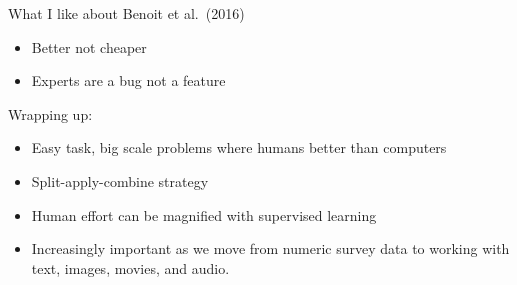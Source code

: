 \documentclass[aspectratio=169]{beamer}
\begin{document}
\begin{frame}

\begin{center}
\end{center}

\end{frame}
\begin{frame}

What I like about Benoit et al.\ (2016)
\begin{itemize}
\item Better not cheaper
\pause
\item Experts are a bug not a feature
\end{itemize}

\end{frame}
\begin{frame}

Wrapping up:
\begin{itemize}
\item Easy task, big scale problems where humans better than computers
\pause
\item Split-apply-combine strategy
\pause
\item Human effort can be magnified with supervised learning 
\pause
\item Increasingly important as we move from numeric survey data to working with text, images, movies, and audio.
\end{itemize}

\end{frame}
\end{document}
